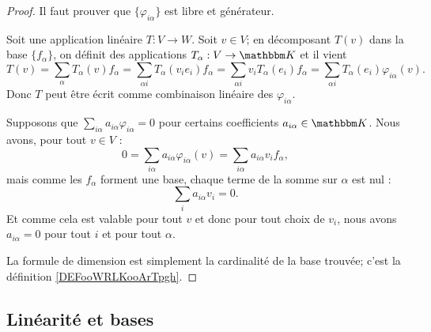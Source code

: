 \begin{proof}
    Il faut prouver que \( \{\varphi_{i\alpha}\}\) est libre et générateur.

    \begin{subproof}
        \item[Générateur]
            Soit une application linéaire \( T\colon V\to W\). Soit \( v \in V \); en décomposant \( T(v)\) dans la base \( \{f_{\alpha}\}\), on définit des applications \( T_{\alpha} : V \to \eK \) et il vient
            \begin{equation}
                T(v)=\sum_{\alpha}T_{\alpha}(v)f_{\alpha} = \sum_{\alpha i }T_{\alpha}(v_i e_i)f_{\alpha} =\sum_{\alpha i }v_iT_{\alpha}(e_i)f_{\alpha}=\sum_{\alpha i}T_{\alpha}(e_i)\varphi_{i\alpha}(v).             
            \end{equation}
            Donc \( T\) peut être écrit comme combinaison linéaire des \( \varphi_{i\alpha}\).

        \item[Libre]
            Supposons que \( \sum_{i\alpha}a_{i\alpha}\varphi_{i\alpha}=0\) pour certains coefficients \( a_{i\alpha}\in \eK\). Nous avons, pour tout \( v\in V\) :
            \begin{equation}
                0=\sum_{i\alpha}a_{i\alpha}\varphi_{i\alpha}(v)=\sum_{i\alpha}a_{i\alpha}v_if_{\alpha},
            \end{equation}
            mais comme les \( f_{\alpha}\) forment une base, chaque terme de la somme sur \( \alpha\) est nul :
            \begin{equation}
                \sum_ia_{i\alpha}v_i=0.
            \end{equation}
            Et comme cela est valable pour tout \( v\) et donc pour tout choix de \( v_i\), nous avons \( a_{i\alpha}=0\) pour tout \( i\) et pour tout \( \alpha\).
    \end{subproof}
    La formule de dimension est simplement la cardinalité de la base trouvée; c'est la définition \ref{DEFooWRLKooArTpgh}.
\end{proof}

\subsection{Linéarité et bases}

